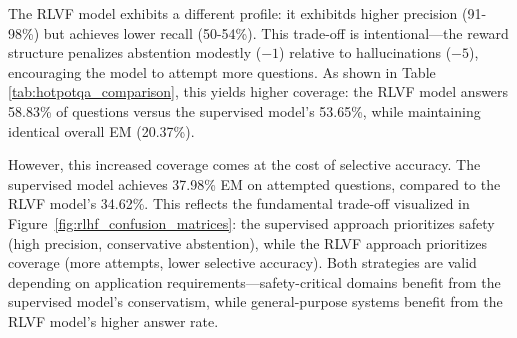 \documentclass{article}
\begin{document}
The RLVF model exhibits a different profile: it exhibitds higher precision (91-98\%) but achieves lower recall (50-54\%). This trade-off is intentional—the reward structure penalizes abstention modestly ($-1$) relative to hallucinations ($-5$), encouraging the model to attempt more questions. As shown in Table \ref{tab:hotpotqa_comparison}, this yields higher coverage: the RLVF model answers 58.83\% of questions versus the supervised model's 53.65\%, while maintaining identical overall EM (20.37\%).

However, this increased coverage comes at the cost of selective accuracy. The supervised model achieves 37.98\% EM on attempted questions, compared to the RLVF model's 34.62\%. This reflects the fundamental trade-off visualized in Figure~\ref{fig:rlhf_confusion_matrices}: the supervised approach prioritizes safety (high precision, conservative abstention), while the RLVF approach prioritizes coverage (more attempts, lower selective accuracy). Both strategies are valid depending on application requirements—safety-critical domains benefit from the supervised model's conservatism, while general-purpose systems benefit from the RLVF model's higher answer rate.
\end{document}

